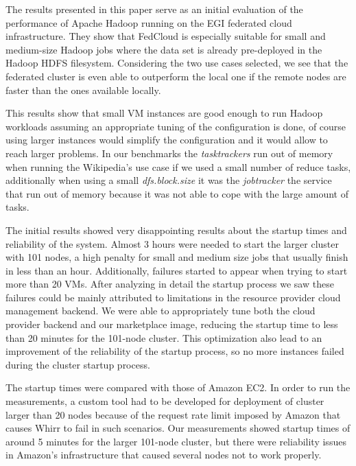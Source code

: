 The results presented in this paper serve as an initial evaluation of the performance of Apache Hadoop running on the EGI federated cloud infrastructure. They show that FedCloud is especially suitable for small and medium-size Hadoop jobs where the data set is already pre-deployed in the Hadoop HDFS filesystem. Considering the two use cases selected, we see that the federated cluster is even able to outperform the local one if the remote nodes are faster than the ones available locally.


This results show that small VM instances are good enough to run Hadoop workloads assuming an appropriate tuning of the configuration is done, of course using larger instances would simplify the configuration and it would allow to reach larger problems. In our benchmarks the \emph{tasktrackers} run out of memory when running the Wikipedia's use case if we used a small number of reduce tasks, additionally when using a small \emph{dfs.block.size} it was the \emph{jobtracker} the service that run out of memory because it was not able to cope with the large amount of tasks.

The initial results showed very disappointing results about the startup times and reliability of the system. Almost 3 hours were needed to start the larger cluster with 101 nodes, a high penalty for small and medium size jobs that usually finish in less than an hour. Additionally, failures started to appear when trying to start more than 20 VMs. After analyzing in detail the startup process we saw these failures could be mainly attributed to limitations in the resource provider cloud management backend. We were able to appropriately tune both the cloud provider backend and our marketplace image, reducing the startup time to less than 20 minutes for the 101-node cluster. This optimization also lead to an improvement of the reliability of the startup process, so no more instances failed during the cluster startup process.

The startup times were compared with those of Amazon EC2. In order to run the measurements, a custom tool had to be developed for deployment of cluster larger than 20 nodes because of the request rate limit imposed by Amazon that causes Whirr to fail in such scenarios. Our measurements showed startup times of around 5 minutes for the larger 101-node cluster, but there were reliability issues in Amazon's infrastructure that caused several nodes not to work properly.

